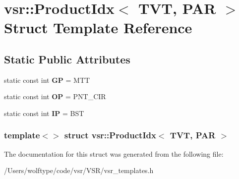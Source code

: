 \hypertarget{structvsr_1_1_product_idx_3_01_t_v_t_00_01_p_a_r_01_4}{\section{vsr\-:\-:Product\-Idx$<$ T\-V\-T, P\-A\-R $>$ Struct Template Reference}
\label{structvsr_1_1_product_idx_3_01_t_v_t_00_01_p_a_r_01_4}
}
\subsection*{Static Public Attributes}
\begin{DoxyCompactItemize}
\item 
\hypertarget{structvsr_1_1_product_idx_3_01_t_v_t_00_01_p_a_r_01_4_ac31675645a11db6c8e9483b5bb8ddeb5}{static const int {\bfseries G\-P} = M\-T\-T}\label{structvsr_1_1_product_idx_3_01_t_v_t_00_01_p_a_r_01_4_ac31675645a11db6c8e9483b5bb8ddeb5}

\item 
\hypertarget{structvsr_1_1_product_idx_3_01_t_v_t_00_01_p_a_r_01_4_ac3ec75d91e8efd3ffab1fd5fceba201d}{static const int {\bfseries O\-P} = P\-N\-T\-\_\-\-C\-I\-R}\label{structvsr_1_1_product_idx_3_01_t_v_t_00_01_p_a_r_01_4_ac3ec75d91e8efd3ffab1fd5fceba201d}

\item 
\hypertarget{structvsr_1_1_product_idx_3_01_t_v_t_00_01_p_a_r_01_4_a9029ee16a649166ae5f5d48cc8a9a5dd}{static const int {\bfseries I\-P} = B\-S\-T}\label{structvsr_1_1_product_idx_3_01_t_v_t_00_01_p_a_r_01_4_a9029ee16a649166ae5f5d48cc8a9a5dd}

\end{DoxyCompactItemize}
\subsubsection*{template$<$$>$ struct vsr\-::\-Product\-Idx$<$ T\-V\-T, P\-A\-R $>$}



The documentation for this struct was generated from the following file\-:\begin{DoxyCompactItemize}
\item 
/\-Users/wolftype/code/vsr/\-V\-S\-R/vsr\-\_\-templates.\-h\end{DoxyCompactItemize}
